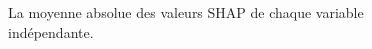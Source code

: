 \documentclass[
  oneside,
  open=any]{scrreprt}
\begin{document}
\begin{figure}[H]


\caption{\label{fig-importance-bar}La moyenne absolue des valeurs SHAP
de chaque variable indépendante.}

\end{figure}%
\end{document}
